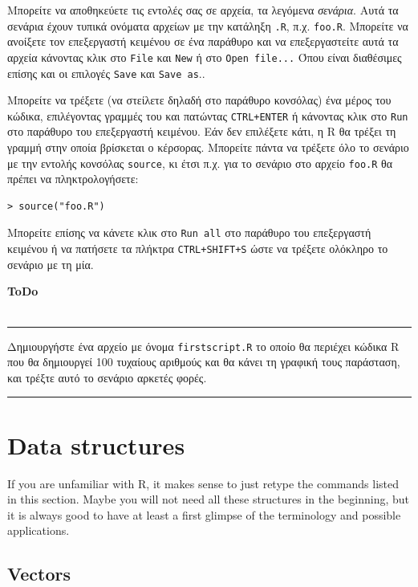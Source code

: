 \documentclass[a4paper,11pt,twocolumn,tablecaptionabove]{scrartcl}
\makeatletter
\newenvironment{ToDo} {%
  \begin{flushright}
    \hfill
    \begin{minipage}{0.95\columnwidth}         %
    \textsf{\textbf{ToDo}} \\
      \vspace{-0.85cm}\\
      {\color{Gray}\rule[-0.1cm]{\columnwidth}{1.5pt}}} { %
      {\color{Gray} \rule[0.3cm]{\columnwidth}{1.5pt}}
    \end{minipage}
    \vspace{1em}
  \end{flushright}
  }
\let\SF@@footnote\footnote
\def\footnote{\ifx\protect\@typeset@protect
 \expandafter\SF@@footnote
 \else
 \expandafter\SF@gobble@opt
 \fi
}
\edef\SF@gobble@opt{\noexpand\protect
 \expandafter\noexpand\csname SF@gobble@opt \endcsname}
\makeatother
\begin{document}
Μπορείτε να αποθηκεύετε τις εντολές σας σε αρχεία, τα λεγόμενα \emph{σενάρια}. Αυτά τα σενάρια έχουν τυπικά
ονόματα αρχείων με την κατάληξη \texttt{.R}, π.χ. \texttt{foo.R}. Μπορείτε να ανοίξετε τον επεξεργαστή κειμένου
σε ένα παράθυρο και να επεξεργαστείτε αυτά τα αρχεία κάνοντας κλικ στο \texttt{File} και \texttt{New} ή στο 
\texttt{Open file...}\footnote{Όπου είναι διαθέσιμες επίσης και οι επιλογές \texttt{Save} και
\texttt{Save as}.}.

Μπορείτε να τρέξετε (να στείλετε δηλαδή στο παράθυρο κονσόλας) ένα μέρος του κώδικα, επιλέγοντας γραμμές του και
πατώντας \texttt{CTRL+ENTER} ή κάνοντας κλικ στο \texttt{Run} στο παράθυρο του επεξεργαστή κειμένου. Εάν δεν
επιλέξετε κάτι, η R θα τρέξει τη γραμμή στην οποία βρίσκεται ο κέρσορας. Μπορείτε πάντα να τρέξετε όλο το
σενάριο με την εντολής κονσόλας \texttt{source}, κι έτσι π.χ. για το σενάριο στο αρχείο \texttt{foo.R} θα πρέπει
να πληκτρολογήσετε:
\begin{Verbatim}[frame=single,gobble=0]
> source("foo.R")
\end{Verbatim}
Μπορείτε επίσης να κάνετε κλικ στο \texttt{Run all} στο παράθυρο του επεξεργαστή κειμένου ή να
πατήσετε τα πλήκτρα \texttt{CTRL+SHIFT+S} ώστε να τρέξετε ολόκληρο το σενάριο με τη μία.

\begin{ToDo}
  Δημιουργήστε ένα αρχείο με όνομα \texttt{firstscript.R} το οποίο θα περιέχει κώδικα R που θα δημιουργεί 100
  τυχαίους αριθμούς και θα κάνει τη γραφική τους παράσταση, και τρέξτε αυτό το σενάριο αρκετές φορές.\\
\end{ToDo}


\section{Data structures} 
\label{sec:structures}

If you are unfamiliar with R, it makes sense to just retype the commands
listed in this section. Maybe you will not need all these structures in the
beginning, but it is always good to have at least a first glimpse of the
terminology and possible applications.

\subsection{Vectors}
\end{document}
